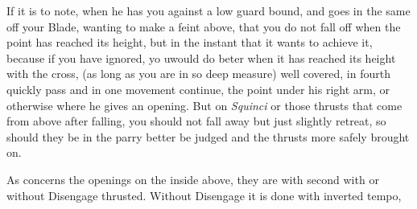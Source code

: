 If it is to note, when he has you against a low guard bound, and goes
in the same off your Blade, wanting to make a feint above, that you do
not fall off when the point has reached its height, but in the instant
that it wants to achieve it, because if you have ignored, yo uwould do
beter when it has reached its height with the cross, (as long as you
are in so deep measure) well covered, in fourth quickly
pass and in one movement continue, the point under his right arm, or
otherwise where he gives an opening. But on {\it Squinci} or those
thrusts that come from above after falling, you should not fall away
but just slightly retreat, so should they be in the parry better be
judged and the thrusts more safely brought on.


As concerns the openings on the inside above, they are with second
with or without Disengage thrusted. Without Disengage it is done with
inverted tempo,